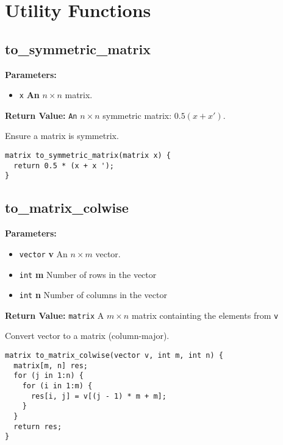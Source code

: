 \documentclass[]{book}
\providecommand{\tightlist}{%
  \setlength{\itemsep}{0pt}\setlength{\parskip}{0pt}}
\begin{document}
\section{Utility Functions}\label{utility-functions}

\subsection{to\_symmetric\_matrix}\label{toux5fsymmetricux5fmatrix}

\textbf{Parameters:}

\begin{itemize}
\tightlist
\item
  \texttt{x} \textbf{An} \(n \times n\) matrix.
\end{itemize}

\textbf{Return Value:} \texttt{An} \(n \times n\) symmetric matrix:
\(0.5 (x + x')\).

Ensure a matrix is symmetrix.

\begin{verbatim}
matrix to_symmetric_matrix(matrix x) {
  return 0.5 * (x + x ');
}
\end{verbatim}

\subsection{to\_matrix\_colwise}\label{toux5fmatrixux5fcolwise}

\textbf{Parameters:}

\begin{itemize}
\tightlist
\item
  \texttt{vector} \textbf{v} An \(n \times m\) vector.
\item
  \texttt{int} \textbf{m} Number of rows in the vector
\item
  \texttt{int} \textbf{n} Number of columns in the vector
\end{itemize}

\textbf{Return Value:} \texttt{matrix} A \(m \times n\) matrix
containting the elements from \texttt{v}

Convert vector to a matrix (column-major).

\begin{verbatim}
matrix to_matrix_colwise(vector v, int m, int n) {
  matrix[m, n] res;
  for (j in 1:n) {
    for (i in 1:m) {
      res[i, j] = v[(j - 1) * m + m];
    }
  }
  return res;
}
\end{verbatim}
\end{document}
